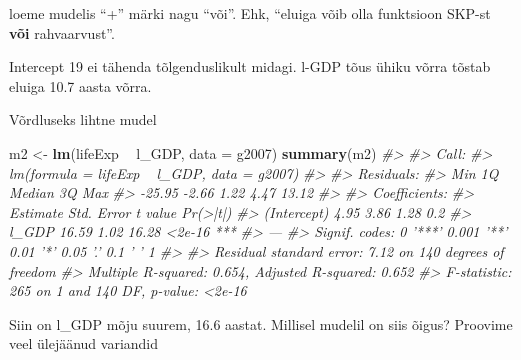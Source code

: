 \documentclass[]{book}
\newenvironment{Shaded}{\begin{snugshade}}{\end{snugshade}}
\newcommand{\KeywordTok}[1]{\textcolor[rgb]{0.13,0.29,0.53}{\textbf{#1}}}
\newcommand{\DataTypeTok}[1]{\textcolor[rgb]{0.13,0.29,0.53}{#1}}
\newcommand{\StringTok}[1]{\textcolor[rgb]{0.31,0.60,0.02}{#1}}
\newcommand{\CommentTok}[1]{\textcolor[rgb]{0.56,0.35,0.01}{\textit{#1}}}
\newcommand{\OperatorTok}[1]{\textcolor[rgb]{0.81,0.36,0.00}{\textbf{#1}}}
\newcommand{\NormalTok}[1]{#1}
\begin{document}
loeme mudelis ``+'' märki nagu ``või''. Ehk, ``eluiga võib olla
funktsioon SKP-st \textbf{või} rahvaarvust''.

Intercept 19 ei tähenda tõlgenduslikult midagi. l-GDP tõus ühiku võrra
tõstab eluiga 10.7 aasta võrra.

Võrdluseks lihtne mudel

\begin{Shaded}
\begin{Highlighting}[]
\NormalTok{m2 <-}\StringTok{ }\KeywordTok{lm}\NormalTok{(lifeExp }\OperatorTok{~}\StringTok{ }\NormalTok{l_GDP, }\DataTypeTok{data =}\NormalTok{ g2007)}
\KeywordTok{summary}\NormalTok{(m2)}
\CommentTok{#> }
\CommentTok{#> Call:}
\CommentTok{#> lm(formula = lifeExp ~ l_GDP, data = g2007)}
\CommentTok{#> }
\CommentTok{#> Residuals:}
\CommentTok{#>    Min     1Q Median     3Q    Max }
\CommentTok{#> -25.95  -2.66   1.22   4.47  13.12 }
\CommentTok{#> }
\CommentTok{#> Coefficients:}
\CommentTok{#>             Estimate Std. Error t value Pr(>|t|)    }
\CommentTok{#> (Intercept)     4.95       3.86    1.28      0.2    }
\CommentTok{#> l_GDP          16.59       1.02   16.28   <2e-16 ***}
\CommentTok{#> ---}
\CommentTok{#> Signif. codes:  0 '***' 0.001 '**' 0.01 '*' 0.05 '.' 0.1 ' ' 1}
\CommentTok{#> }
\CommentTok{#> Residual standard error: 7.12 on 140 degrees of freedom}
\CommentTok{#> Multiple R-squared:  0.654,  Adjusted R-squared:  0.652 }
\CommentTok{#> F-statistic:  265 on 1 and 140 DF,  p-value: <2e-16}
\end{Highlighting}
\end{Shaded}

Siin on l\_GDP mõju suurem, 16.6 aastat. Millisel mudelil on siis õigus?
Proovime veel ülejäänud variandid
\end{document}
